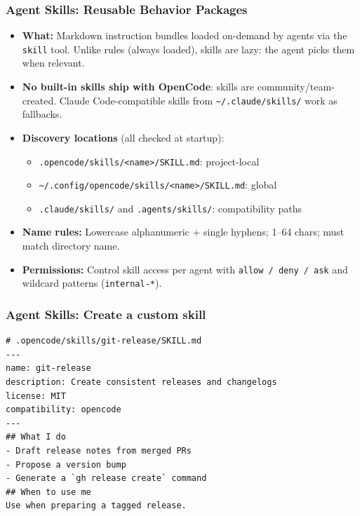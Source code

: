 \begin{frame}[fragile]\frametitle{Agent Skills:  Reusable Behavior Packages}
  \begin{itemize}
    \item \textbf{What:} Markdown instruction bundles loaded on-demand by agents via the \texttt{skill} tool. Unlike rules (always loaded), skills are lazy:  the agent picks them when relevant.
    \item \textbf{No built-in skills ship with OpenCode}:  skills are community/team-created. Claude Code-compatible skills from \texttt{\textasciitilde/.claude/skills/} work as fallbacks.
    \item \textbf{Discovery locations} (all checked at startup):
      \begin{itemize}
        \item \texttt{.opencode/skills/<name>/SKILL.md}:  project-local
        \item \texttt{\textasciitilde/.config/opencode/skills/<name>/SKILL.md}:  global
        \item \texttt{.claude/skills/} and \texttt{.agents/skills/}:  compatibility paths
      \end{itemize}
    \item \textbf{Name rules:} Lowercase alphanumeric + single hyphens; 1–64 chars; must match directory name.
    \item \textbf{Permissions:} Control skill access per agent with \texttt{allow / deny / ask} and wildcard patterns (\texttt{internal-*}).
  \end{itemize}		


\end{frame}


\begin{frame}[fragile]\frametitle{Agent Skills:  Create a custom skill}
	
\begin{lstlisting}
# .opencode/skills/git-release/SKILL.md
---
name: git-release
description: Create consistent releases and changelogs
license: MIT
compatibility: opencode
---
## What I do
- Draft release notes from merged PRs
- Propose a version bump
- Generate a `gh release create` command
## When to use me
Use when preparing a tagged release.
\end{lstlisting}

\end{frame}

